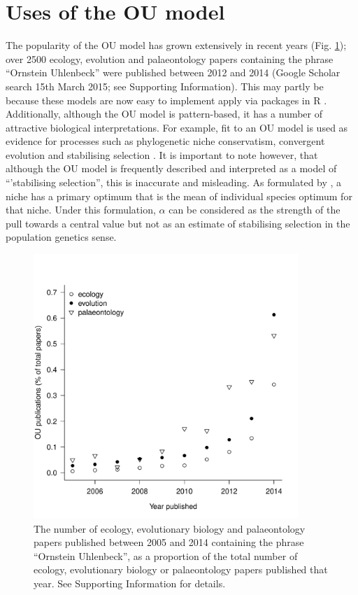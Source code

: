 \documentclass[a4paper,12pt]{article}
\begin{document}
\section{Uses of the OU model}
  The popularity of the OU model has grown extensively in recent years (Fig. \ref{figure.literature}); over 2500 ecology, evolution and palaeontology papers containing the phrase ``Ornstein Uhlenbeck'' were published between 2012 and 2014 (Google Scholar search 15th March 2015; see Supporting Information).
  This may partly be because these models are now easy to implement apply via packages in R \citep[e.g. ouch, GEIGER and OUwie;][]{Butler:2004aa,Harmon:2008aa,beaulieu2012ouwie}. 
  Additionally, although the OU model is pattern-based, it has a number of attractive biological interpretations. 
  For example, fit to an OU model is used as evidence for processes such as phylogenetic niche conservatism, convergent evolution and stabilising selection \citep[e.g.,][]{Wiens:2010aa,christin2013anatomical,ingram2013surface}. 
  It is important to note however, that although the OU model is frequently described and interpreted as a model of ``'stabilising selection'', this is inaccurate and misleading. As formulated by \citet{hansen1997stabilizing}, a niche has a primary optimum that is the mean of individual species optimum for that niche. 
  Under this formulation, $\alpha$ can be considered as the strength of the pull towards a central value \citep[the primary optimum;][]{hansen2012adaptive} but not as an estimate of stabilising selection in the population genetics sense. 

    \begin{figure}[!htbp]
      \centering
      \includegraphics[width=10cm, height=10cm, keepaspectratio=true]{Figures/OhYou_Figure1.pdf}
      \caption{The number of ecology, evolutionary biology and palaeontology papers published between 2005 and 2014 containing the phrase ``Ornstein Uhlenbeck'', as a proportion of the total number of ecology, evolutionary biology or palaeontology papers published that year. See Supporting Information for details.
      }
      \label{figure.literature}
\end{figure}
\end{document}

